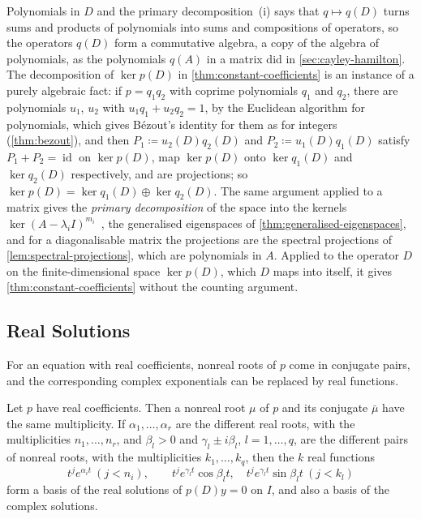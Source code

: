 \begin{note}{Polynomials in $D$ and the primary decomposition}
\,(i) says that $q\mapsto q(D)$ turns sums and products of polynomials into sums and compositions of operators, so the operators $q(D)$ form a commutative algebra, a copy of the algebra of polynomials, as the polynomials $q(A)$ in a matrix did in \cref{sec:cayley-hamilton}. The decomposition of $\ker p(D)$ in \cref{thm:constant-coefficients} is an instance of a purely algebraic fact: if $p=q_1q_2$ with coprime polynomials $q_1$ and $q_2$, there are polynomials $u_1$, $u_2$ with $u_1q_1+u_2q_2=1$, by the Euclidean algorithm for polynomials, which gives B\'ezout's identity for them as for integers (\cref{thm:bezout}), and then $P_1\coloneqq u_2(D)q_2(D)$ and $P_2\coloneqq u_1(D)q_1(D)$ satisfy $P_1+P_2=\operatorname{id}$ on $\ker p(D)$, map $\ker p(D)$ onto $\ker q_1(D)$ and $\ker q_2(D)$ respectively, and are projections; so $\ker p(D)=\ker q_1(D)\oplus\ker q_2(D)$. The same argument applied to a matrix gives the \emph{primary decomposition} of the space into the kernels $\ker(A-\lambda_iI)^{m_i}$~\cite[Chap.~6]{hoffman1971}, the generalised eigenspaces of \cref{thm:generalised-eigenspaces}, and for a diagonalisable matrix the projections are the spectral projections of \cref{lem:spectral-projections}, which are polynomials in $A$. Applied to the operator $D$ on the finite-dimensional space $\ker p(D)$, which $D$ maps into itself, it gives \cref{thm:constant-coefficients} without the counting argument.
\end{note}

\subsection{Real Solutions}

For an equation with real coefficients, nonreal roots of $p$ come in conjugate pairs, and the corresponding complex exponentials can be replaced by real functions.

\begin{corollary}
\label{cor:real-fundamental}
Let $p$ have real coefficients. Then a nonreal root $\mu$ of $p$ and its conjugate $\bar\mu$ have the same multiplicity. If $\alpha_1,\ldots,\alpha_r$ are the different real roots, with the multiplicities $n_1,\ldots,n_r$, and $\beta_l>0$ and $\gamma_l\pm i\beta_l$, $l=1,\ldots,q$, are the different pairs of nonreal roots, with the multiplicities $k_1,\ldots,k_q$, then the $k$ real functions
\[
t^je^{\alpha_it}\ (j<n_i),\qquad t^je^{\gamma_lt}\cos\beta_lt,\quad t^je^{\gamma_lt}\sin\beta_lt\ (j<k_l)
\]
form a basis of the real solutions of $p(D)y=0$ on $I$, and also a basis of the complex solutions.
\end{corollary}


